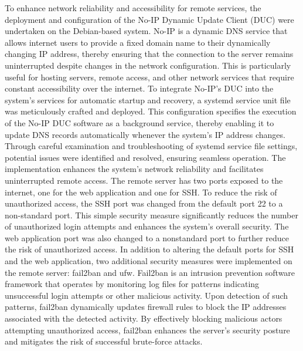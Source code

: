 \documentclass[12pt]{article}
\begin{document}
\noindent To enhance network reliability and accessibility for remote services, the deployment and configuration of the No-IP Dynamic Update Client (DUC) were undertaken on the Debian-based system. No-IP is a dynamic DNS service that allows internet users to provide a fixed domain name to their dynamically changing IP address, thereby ensuring that the connection to the server remains uninterrupted despite changes in the network configuration. This is particularly useful for hosting servers, remote access, and other network services that require constant accessibility over the internet. To integrate No-IP's DUC into the system's services for automatic startup and recovery, a systemd service unit file was meticulously crafted and deployed. This configuration specifies the execution of the No-IP DUC software as a background service, thereby enabling it to update DNS records automatically whenever the system's IP address changes. Through careful examination and troubleshooting of systemd service file settings, potential issues were identified and resolved, ensuring seamless operation. The implementation enhances the system's network reliability and facilitates uninterrupted remote access.
\newline
\newline
\noindent The remote server has two ports exposed to the internet, one for the web application and one for SSH. To reduce the risk of unauthorized access, the SSH port was changed from the default port 22 to a non-standard port. This simple security measure significantly reduces the number of unauthorized login attempts and enhances the system's overall security. The web application port was also changed to a nonstandard port to further reduce the risk of unauthorized access. In addition to altering the default ports for SSH and the web application, two additional security measures were implemented on the remote server: fail2ban and ufw.
\newline
\newline
\noindent Fail2ban is an intrusion prevention software framework that operates by monitoring log files for patterns indicating unsuccessful login attempts or other malicious activity. Upon detection of such patterns, fail2ban dynamically updates firewall rules to block the IP addresses associated with the detected activity. By effectively blocking malicious actors attempting unauthorized access, fail2ban enhances the server's security posture and mitigates the risk of successful brute-force attacks.
\newline
\end{document}
